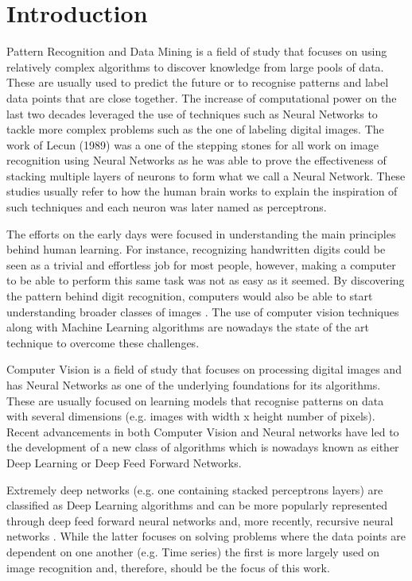 \chapter{Introduction}
Pattern Recognition and Data Mining is a field of study that focuses on using relatively complex algorithms to discover knowledge from large pools of data. These are usually used to predict the future or to recognise patterns and label data points that are close together. The increase of computational power on the last two decades leveraged the use of techniques such as Neural Networks \cite{bishop1995neural} to tackle more complex problems such as the one of labeling digital images. The work of Lecun (1989) \cite{lecunn89} was a one of the stepping stones for all work on image recognition using Neural Networks as he was able to prove the effectiveness of stacking multiple layers of neurons to form what we call a Neural Network. These studies usually refer to how the human brain works to explain the inspiration of such techniques and each neuron was later named as perceptrons.

The efforts on the early days were focused in understanding the main principles behind human learning. For instance, recognizing handwritten digits could be seen as a trivial and effortless job for most people, however, making a computer to be able to perform this same task was not as easy as it seemed. By discovering the pattern behind digit recognition, computers would also be able to start understanding broader classes of images \cite{krizhevsky2012}. The use of computer vision techniques along with Machine Learning algorithms are nowadays the state of the art technique to overcome these challenges.

Computer Vision is a field of study that focuses on processing digital images and has Neural Networks as one of the underlying foundations for its algorithms. These are usually  focused on learning models that recognise patterns on data with several dimensions (e.g. images with width x height number of pixels). Recent advancements in both Computer Vision and Neural networks have led to the development of a new class of algorithms which is nowadays known as either Deep Learning or Deep Feed Forward Networks.

Extremely deep networks (e.g. one containing stacked perceptrons layers) are classified as Deep Learning algorithms and can be more popularly represented through deep feed forward neural networks \cite{hornik1989multilayer} and, more recently, recursive neural networks \cite{goller1996learning}. While the latter focuses on solving problems where the data points are dependent on one another (e.g. Time series) the first is more largely used on image recognition and, therefore, should be the focus of this work.

